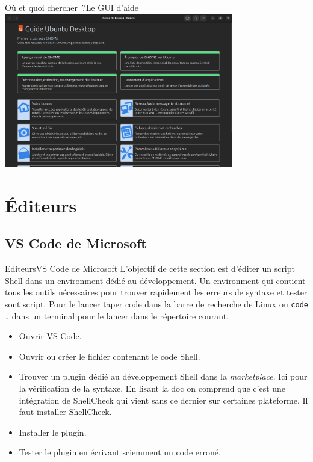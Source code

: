 \documentclass{beamer}
\begin{document}
    \begin{frame}{Où et quoi chercher~?}{Le GUI d'aide}
        \centering
        \includegraphics[width=10cm]{image/aide}
    \end{frame}


    \section{Éditeurs}\label{sec:editor}

    \subsection{VS Code de Microsoft}\label{subsec:vscode}

    \begin{frame}{Editeurs}{VS Code de Microsoft}
        L'objectif de cette section est d'éditer un script Shell dans un environment dédié au développement.
        Un environment qui contient tous les outils nécessaires pour trouver rapidement les erreurs de syntaxe et tester sont script.
        \bigbreak
        Pour le lancer taper code dans la barre de recherche de Linux ou \lstinline{code .} dans un terminal pour le lancer dans le répertoire courant.
        \begin{itemize}
            \item Ouvrir VS Code.
            \item Ouvrir ou créer le fichier contenant le code Shell.
            \item Trouver un plugin dédié au développement Shell dans la \textit{marketplace}.
            Ici  pour la vérification de la syntaxe.
            En lisant la doc on comprend que c'est une intégration de ShellCheck qui vient sans ce dernier sur certaines plateforme.
            Il faut installer ShellCheck.
            \item Installer le plugin.
            \item Tester le plugin en écrivant sciemment un code erroné.
        \end{itemize}
    \end{frame}
\end{document}
